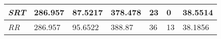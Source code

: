 \documentclass{article}
\begin{document}
\begin{table}[h!]
\begin{tabular}{|l|l|l|l|l|l|l|}
  \textit{SRT}       & 286.957                                                                          & 87.5217                                                                     & 378.478                                                                            & 23                                                                                    & 0                                                                                   & 38.5514                                                                    \\ \hline
  \textit{RR}        & 286.957                                                                          & 95.6522                                                                     & 388.87                                                                             & 36                                                                                    & 13                                                                                  & 38.1856                                                                    \\ \hline
  \end{tabular}
  \label{table:1}
\end{table}
\end{document}

